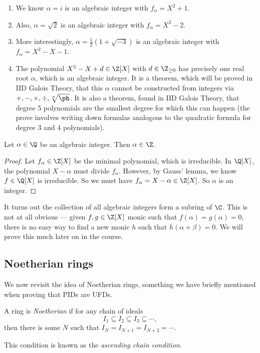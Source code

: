 \documentclass[a4paper]{article}
\begin{document}
\begin{eg}\leavevmode
  \begin{enumerate}
    \item We know $\alpha = i$ is an algebraic integer with $f_\alpha = X^2 + 1$.
    \item Also, $\alpha = \sqrt{2}$ is an algebraic integer with $f_\alpha = X^2 - 2$.
    \item More interestingly, $\alpha = \frac{1}{2}(1 + \sqrt{-3})$ is an algebraic integer with $f_\alpha = X^2 - X - 1$.
    \item The polynomial $X^5 - X + d \in \Z[X]$ with $d \in \Z_{\geq 0}$ has precisely one real root $\alpha$, which is an algebraic integer. It is a theorem, which will be proved in IID Galois Theory, that this $\alpha$ cannot be constructed from integers via $+, -, \times, \div, \sqrt[n]{\ph}$. It is also a theorem, found in IID Galois Theory, that degree 5 polynomials are the smallest degree for which this can happen (the prove involves writing down formulas analogous to the quadratic formula for degree $3$ and $4$ polynomials).
  \end{enumerate}
\end{eg}

\begin{lemma}
  Let $\alpha \in \Q$ be an algebraic integer. Then $\alpha \in \Z$.
\end{lemma}

\begin{proof}
  Let $f_\alpha \in \Z[X]$ be the minimal polynomial, which is irreducible. In $\Q[X]$, the polynomial $X - \alpha$ must divide $f_\alpha$. However, by Gauss' lemma, we know $f \in \Q[X]$ is irreducible. So we must have $f_\alpha = X - \alpha \in \Z[X]$. So $\alpha$ is an integer.
\end{proof}

It turns out the collection of all algebraic integers form a subring of $\C$. This is not at all obvious --- given $f, g \in \Z[X]$ monic such that $f(\alpha) = g(\alpha) = 0$, there is no easy way to find a new monic $h$ such that $h(\alpha + \beta) = 0$. We will prove this much later on in the course.

\subsection{Noetherian rings}
We now revisit the idea of Noetherian rings, something we have briefly mentioned when proving that PIDs are UFDs.
\begin{defi}
  A ring is \emph{Noetherian} if for any chain of ideals
  \[
    I_1 \subseteq I_2 \subseteq I_3 \subseteq \cdots,
  \]
  then there is some $N$ such that $I_N = I_{N + 1} = I_{N + 2} = \cdots$.

  This condition is known as the \emph{ascending chain condition}.
\end{defi}
\end{document}
